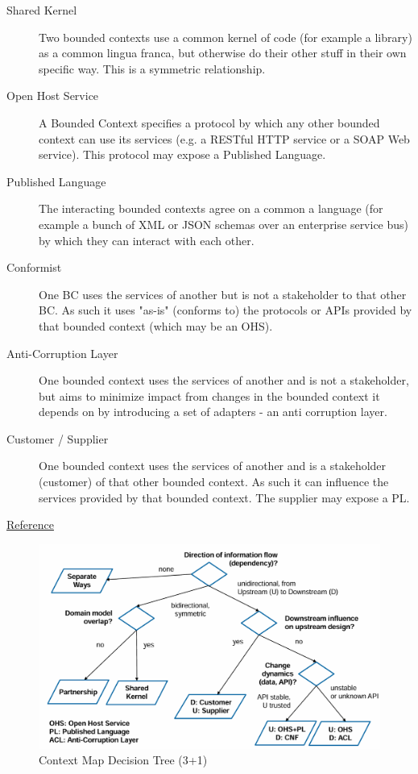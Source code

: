 \documentclass[../Main.tex]{subfiles}
\begin{document}
\begin{description}
    \item[Shared Kernel] Two bounded contexts use a common kernel of code (for example a library) as a common lingua
    franca, but otherwise do their other stuff in their own specific way. This is a symmetric relationship.
    \item[Open Host Service] A Bounded Context specifies a protocol by which any other bounded context can use its services (e.g. 
    a RESTful HTTP service or a SOAP Web service). This protocol may expose a Published Language.
    \item[Published Language] The interacting bounded contexts agree on a common a language (for example a bunch of XML or 
    JSON schemas over an enterprise service bus) by which they can interact with each other.
    \item[Conformist] One BC uses the services of another but is not a stakeholder to that other BC. As such it uses "as-is" 
    (conforms to) the protocols or APIs provided by that bounded context (which may be an OHS).
    \item[Anti-Corruption Layer] One bounded context uses the services of another and is not a stakeholder, but aims to minimize 
    impact from changes in the bounded context it depends on by introducing a set of adapters - an anti
    corruption layer.
    \item[Customer / Supplier] One bounded context uses the services of another and is a stakeholder (customer) of that other 
    bounded context. As such it can influence the services provided by that bounded context. The supplier 
    may expose a PL.
\end{description}
\href{https://www.methodsandtools.com/archive/archive.php?id=97}{Reference}

\begin{figure}[H]
    \centering
    \includegraphics[width=1\linewidth]{Images/context-map-decision-tree.png}
    \caption{Context Map Decision Tree (3+1)}
\end{figure}
\end{document}
